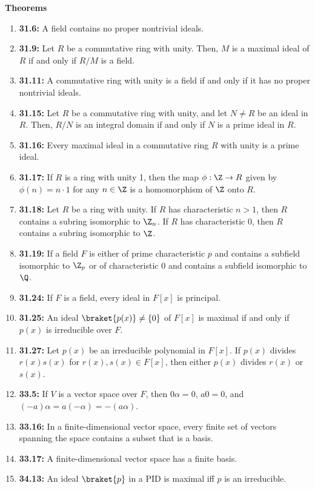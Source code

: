\documentclass[notitlepage]{report}
\begin{document}
  \textbf{Theorems}
  \begin{enumerate}
    \item \textbf{31.6:} A field contains no proper nontrivial ideals.
    \item \textbf{31.9:} Let $R$ be a commutative ring with unity. Then, $M$ is a maximal ideal of $R$ if and only if $R/M$ is a field.
    \item \textbf{31.11:} A commutative ring with unity is a field if and only if it has no proper nontrivial ideals.
    \item \textbf{31.15:} Let $R$ be a commutative ring with unity, and let $N \ne R$ be an ideal in $R$. Then, $R/N$ is an integral domain if and only if $N$ is a prime ideal in $R$.
    \item \textbf{31.16:} Every maximal ideal in a commutative ring $R$ with unity is a prime ideal.
    \item \textbf{31.17:} If $R$ is a ring with unity 1, then the map $\phi : \Z \to R$ given by $\phi(n) = n \cdot 1$ for any $n \in \Z$ is a homomorphism of $\Z$ onto $R$.
    \item \textbf{31.18:} Let $R$ be a ring with unity. If $R$ has characteristic $n > 1$, then $R$ contains a subring isomorphic to $\Z_n$. If $R$ has characteristic 0, then $R$ contains a subring isomorphic to $\Z$.
    \item \textbf{31.19:} If a field $F$ is either of prime characteristic $p$ and contains a subfield isomorphic to $\Z_p$ or of characteristic 0 and contains a subfield isomorphic to $\Q$.
    \item \textbf{31.24:} If $F$ is a field, every ideal in $F[x]$ is principal.
    \item \textbf{31.25:} An ideal $\braket{p(x)} \ne \{0\}$ of $F[x]$ is maximal if and only if $p(x)$ is irreducible over $F$.
    \item \textbf{31.27:} Let $p(x)$ be an irreducible polynomial in $F[x]$. If $p(x)$ divides $r(x)s(x)$ for $r(x), s(x) \in F[x]$, then either $p(x)$ divides $r(x)$ or $s(x)$.
    \item \textbf{33.5:} If $V$ is a vector space over $F$, then $0\alpha = 0$, $a0 = 0$, and $(-a)\alpha = a(-\alpha) = -(a\alpha)$.
    \item \textbf{33.16:} In a finite-dimensional vector space, every finite set of vectors spanning the space contains a subset that is a basis.
    \item \textbf{33.17:} A finite-dimensional vector space has a finite basis.
    \item \textbf{34.13:} An ideal $\braket{p}$ in a PID is maximal iff $p$ is an irreducible.

\end{enumerate}
\end{document}
